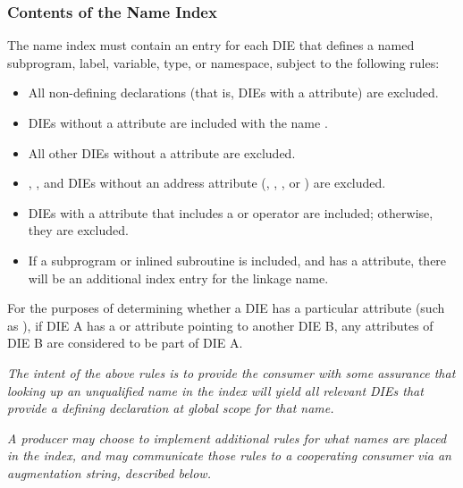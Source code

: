 \subsubsection{Contents of the Name Index}
\label{chap:contentsofthenameindex}
The name index must contain an entry for each DIE that defines a
named subprogram, label, variable, type, or namespace, subject to
the following rules:
\begin{itemize}

\item All non-defining declarations (that is, DIEs with a
      \DWATdeclaration{} attribute) are excluded.

\item \DWTAGnamespace{} DIEs without a \DWATname{} attribute are
      included with the name .

\item All other DIEs without a \DWATname{} attribute are excluded.

\item \DWTAGsubprogram{}, \DWTAGinlinedsubroutine{}, and
      \DWTAGlabel{} DIEs without an address attribute (\DWATlowpc{},
      \DWAThighpc{}, \DWATranges{}, or \DWATentrypc{}) are excluded.

\item \DWTAGvariable{} DIEs with a \DWATlocation{} attribute that
      includes a \DWOPaddr{} or \DWOPformtlsaddress{} operator are
      included; otherwise, they are excluded.

\item If a subprogram or inlined subroutine is included, and has a
      \DWATlinkagename{} attribute, there will be an additional
      index entry for the linkage name.
      
\end{itemize}

For the purposes of determining whether a DIE has a particular
attribute (such as \DWATname{}), if DIE A has a \DWATspecification{}
or \DWATabstractorigin{} attribute pointing to another DIE B, any
attributes of DIE B are considered to be part of DIE A.

\textit{The intent of the above rules is to provide the consumer with
some assurance that looking up an unqualified name in the index
will yield all relevant DIEs that provide a defining declaration
at global scope for that name.}

\textit{A producer may choose to implement additional rules for what
names are placed in the index, and may communicate those rules to
a cooperating consumer via an augmentation string, described
below.}

